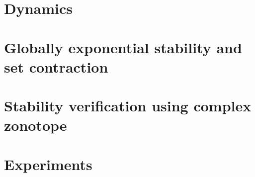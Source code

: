 \section{Dynamics}


\section{Globally exponential stability and set contraction}


\section{Stability verification using complex zonotope}


\section{Experiments}

